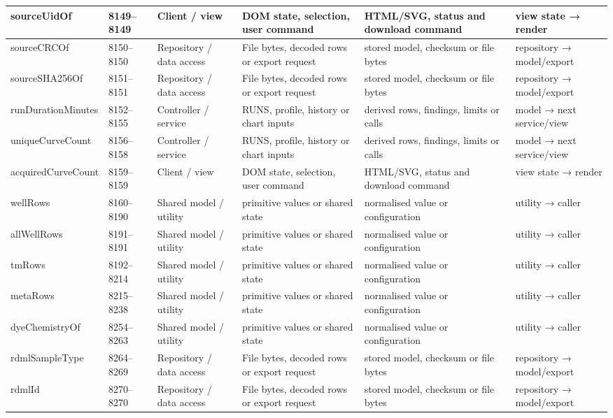 \begin{landscape}
\begin{longtable}{@{}p{3.2cm}p{1.45cm}p{2.7cm}p{4.0cm}p{4.0cm}p{3.0cm}@{}}
sourceUidOf & 8149--8149 & Client / view & DOM state, selection, user command & HTML/SVG, status and download command & view state → render \\\hline
sourceCRCOf & 8150--8150 & Repository / data access & File bytes, decoded rows or export request & stored model, checksum or file bytes & repository → model/export \\\hline
sourceSHA256Of & 8151--8151 & Repository / data access & File bytes, decoded rows or export request & stored model, checksum or file bytes & repository → model/export \\\hline
runDurationMinutes & 8152--8155 & Controller / service & RUNS, profile, history or chart inputs & derived rows, findings, limits or calls & model → next service/view \\\hline
uniqueCurveCount & 8156--8158 & Controller / service & RUNS, profile, history or chart inputs & derived rows, findings, limits or calls & model → next service/view \\\hline
acquiredCurveCount & 8159--8159 & Client / view & DOM state, selection, user command & HTML/SVG, status and download command & view state → render \\\hline
wellRows & 8160--8190 & Shared model / utility & primitive values or shared state & normalised value or configuration & utility → caller \\\hline
allWellRows & 8191--8191 & Shared model / utility & primitive values or shared state & normalised value or configuration & utility → caller \\\hline
tmRows & 8192--8214 & Shared model / utility & primitive values or shared state & normalised value or configuration & utility → caller \\\hline
metaRows & 8215--8238 & Shared model / utility & primitive values or shared state & normalised value or configuration & utility → caller \\\hline
dyeChemistryOf & 8254--8263 & Shared model / utility & primitive values or shared state & normalised value or configuration & utility → caller \\\hline
rdmlSampleType & 8264--8269 & Repository / data access & File bytes, decoded rows or export request & stored model, checksum or file bytes & repository → model/export \\\hline
rdmlId & 8270--8270 & Repository / data access & File bytes, decoded rows or export request & stored model, checksum or file bytes & repository → model/export \\\hline

\end{longtable}
\end{landscape}
